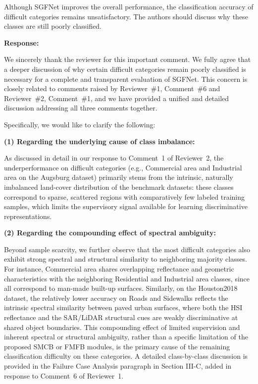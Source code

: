 \vspace{2em}

\begin{tcolorbox}[title={Reviewer \#3, Comment \#3}]
  \vspace{1em}
  
  \color{blue}
  Although SGFNet improves the overall performance, the classification accuracy of difficult categories remains unsatisfactory. The authors should discuss why these classes are still poorly classified.

  \vspace{1em}
\end{tcolorbox}

\textbf{Response:}

We sincerely thank the reviewer for this important comment. We fully agree that a deeper discussion of why certain difficult categories remain poorly classified is necessary for a complete and transparent evaluation of SGFNet. This concern is closely related to comments raised by Reviewer~\#1, Comment~\#6 and Reviewer~\#2, Comment~\#1, and we have provided a unified and detailed discussion addressing all three comments together.

Specifically, we would like to clarify the following:

\textbf{(1) Regarding the underlying cause of class imbalance:}

As discussed in detail in our response to Comment~1 of Reviewer~2, the underperformance on difficult categories (e.g., Commercial area and Industrial area on the Augsburg dataset) primarily stems from the intrinsic, naturally imbalanced land-cover distribution of the benchmark datasets: these classes correspond to sparse, scattered regions with comparatively few labeled training samples, which limits the supervisory signal available for learning discriminative representations.

\textbf{(2) Regarding the compounding effect of spectral ambiguity:}

Beyond sample scarcity, we further observe that the most difficult categories also exhibit strong spectral and structural similarity to neighboring majority classes. For instance, Commercial area shares overlapping reflectance and geometric characteristics with the neighboring Residential and Industrial area classes, since all correspond to man-made built-up surfaces. Similarly, on the Houston2018 dataset, the relatively lower accuracy on Roads and Sidewalks reflects the intrinsic spectral similarity between paved urban surfaces, where both the HSI reflectance and the SAR/LiDAR structural cues are weakly discriminative at shared object boundaries. This compounding effect of limited supervision and inherent spectral or structural ambiguity, rather than a specific limitation of the proposed SMCB or FMFB modules, is the primary cause of the remaining classification difficulty on these categories. A detailed class-by-class discussion is provided in the Failure Case Analysis paragraph in Section III-C, added in response to Comment~6 of Reviewer~1.



